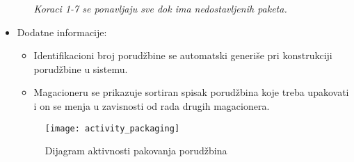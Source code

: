 \begin{itemize}
\begin{enumerate}
			\textit{Koraci 1-7 se ponavljaju sve dok ima nedostavljenih paketa.}
		\end{enumerate}
		\item{Dodatne informacije:}
		\begin{itemize}
			\item{Identifikacioni broj porudžbine se automatski generiše pri konstrukciji porudžbine u sistemu.}
			\item{Magacioneru se prikazuje sortiran spisak porudžbina koje treba upakovati i on se menja u zavisnosti od rada drugih magacionera. }
		\end{itemize}
	\begin{figure}[H]
		\begin{center}
			\texttt{[image: activity\_packaging]}
			\caption{Dijagram aktivnosti pakovanja porudžbina}		
		\end{center}
	\end{figure}
	\end{itemize}
